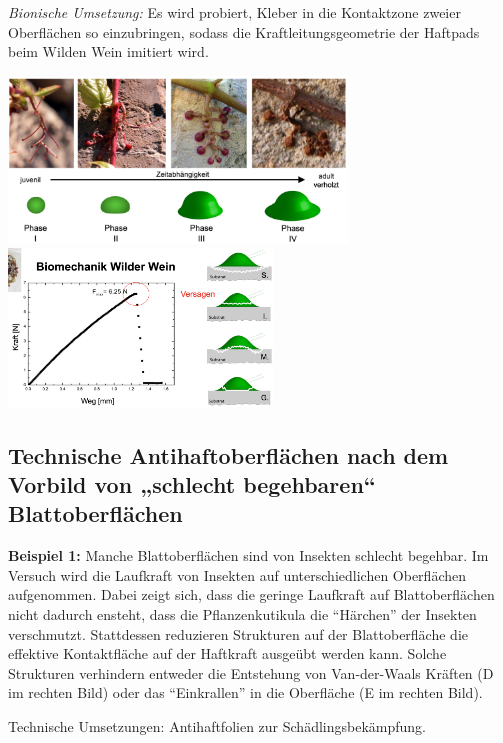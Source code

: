 \textit{Bionische Umsetzung:} Es wird probiert, Kleber in die Kontaktzone zweier Oberflächen so einzubringen, sodass die Kraftleitungsgeometrie der Haftpads beim Wilden Wein imitiert wird.

\begin{center}
    \includegraphics[width=9cm]{lec4/figures/wein_zeit.png}
    \hfill
    \includegraphics[width=7cm]{lec4/figures/wein_versagen.png}
\end{center}

\subsection{Technische Antihaftoberflächen nach dem Vorbild von „schlecht begehbaren“ Blattoberflächen}

\textbf{Beispiel 1:} Manche Blattoberflächen sind von Insekten schlecht begehbar. Im Versuch wird die Laufkraft von Insekten auf unterschiedlichen Oberflächen aufgenommen. Dabei zeigt sich, dass die geringe Laufkraft auf Blattoberflächen nicht dadurch ensteht, dass die Pflanzenkutikula die ``Härchen'' der Insekten verschmutzt. Stattdessen reduzieren Strukturen auf der Blattoberfläche die effektive Kontaktfläche auf der Haftkraft ausgeübt werden kann. Solche Strukturen verhindern entweder die Entstehung von Van-der-Waals Kräften (D im rechten Bild) oder das ``Einkrallen'' in die Oberfläche (E im rechten Bild).

Technische Umsetzungen: Antihaftfolien zur Schädlingsbekämpfung.

